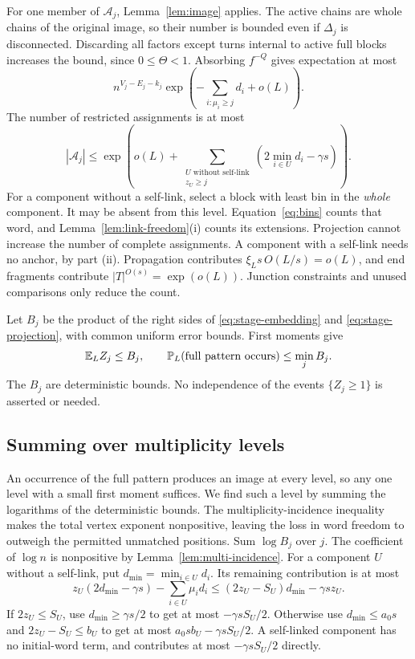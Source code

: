 For one member of $\mathcal A_j$, Lemma~\ref{lem:image} applies. The active chains are whole chains of the original image, so their number is bounded even if $\Delta_j$ is disconnected. Discarding all factors except turns internal to active full blocks increases the bound, since $0\le\Theta<1$. Absorbing $f^{-Q}$ gives expectation at most
\begin{equation}\label{eq:stage-embedding}
 n^{V_j-E_j-k_j}\exp\left(-\sum_{i:\mu_i\ge j}d_i+o(L)\right).
\end{equation}
The number of restricted assignments is at most
\begin{equation}\label{eq:stage-projection}
 |\mathcal A_j|\le
 \exp\left(o(L)+
 \sum_{\substack{U\text{ without self-link}\\z_U\ge j}}
       (2\min_{i\in U}d_i-\gamma s)\right).
\end{equation}
For a component without a self-link, select a block with least bin in the \emph{whole} component. It may be absent from this level. Equation~\eqref{eq:bins} counts that word, and Lemma~\ref{lem:link-freedom}(i) counts its extensions. Projection cannot increase the number of complete assignments. A component with a self-link needs no anchor, by part (ii). Propagation contributes $\xi_Ls\,O(L/s)=o(L)$, and end fragments contribute $|T|^{O(s)}=\exp(o(L))$. Junction constraints and unused comparisons only reduce the count.

Let $B_j$ be the product of the right sides of \eqref{eq:stage-embedding} and \eqref{eq:stage-projection}, with common uniform error bounds. First moments give
\begin{equation}\label{eq:minimum-stages}
 \mathbb E_LZ_j\le B_j,\qquad
 \mathbb P_L(\text{full pattern occurs})\le\min_jB_j.
\end{equation}
The $B_j$ are deterministic bounds. No independence of the events $\{Z_j\ge1\}$ is asserted or needed.

\subsection{Summing over multiplicity levels}

An occurrence of the full pattern produces an image at every level, so any one level with a small first moment suffices. We find such a level by summing the logarithms of the deterministic bounds. The multiplicity-incidence inequality makes the total vertex exponent nonpositive, leaving the loss in word freedom to outweigh the permitted unmatched positions.
Sum $\log B_j$ over $j$. The coefficient of $\log n$ is nonpositive by Lemma~\ref{lem:multi-incidence}. For a component $U$ without a self-link, put $d_{\min}=\min_{i\in U}d_i$. Its remaining contribution is at most
\[
 z_U(2d_{\min}-\gamma s)-\sum_{i\in U}\mu_id_i
 \le(2z_U-S_U)d_{\min}-\gamma sz_U.
\]
If $2z_U\le S_U$, use $d_{\min}\ge\gamma s/2$ to get at most $-\gamma sS_U/2$. Otherwise use $d_{\min}\le a_0s$ and $2z_U-S_U\le b_U$ to get at most $a_0sb_U-\gamma sS_U/2$. A self-linked component has no initial-word term, and contributes at most $-\gamma sS_U/2$ directly.

